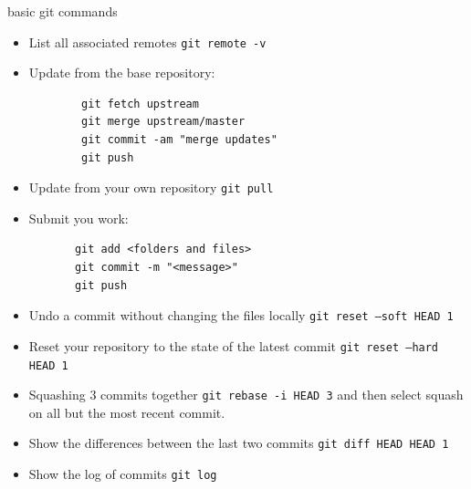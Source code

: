\documentclass[10pt]{beamer}
\begin{document}
      \begin{frame}{basic git commands}
      \begin{itemize}
      \item List all associated remotes \texttt{git remote -v}
      
      \item Update from the base repository:
      \begin{verbatim}
        git fetch upstream
        git merge upstream/master
        git commit -am "merge updates"
        git push
      \end{verbatim}
      
      \item Update from your own repository \texttt{git pull}

      \item Submit you work: \\
      \begin{verbatim}
       git add <folders and files>
       git commit -m "<message>"
       git push
      \end{verbatim}

        \framebreak
    
      \item Undo a commit without changing the files locally \texttt{git reset --soft HEAD~1}
      
      \item Reset your repository to the state of the latest commit \texttt{git reset --hard HEAD~1}
 
      \item Squashing 3 commits together \texttt{git rebase -i HEAD~3} and then select squash on all but the most recent commit.
      
      \item Show the differences between the last two commits \texttt{git diff HEAD HEAD~1}
      
      \item Show the log of commits \texttt{git log}
      

\end{itemize}
\end{frame}
\end{document}
